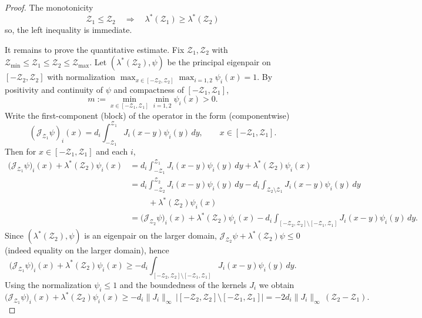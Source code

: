 \documentclass[a4paper,11pt]{amsart}
\theoremstyle{definition}
\numberwithin{equation}{section}
\theoremstyle{definition}
\begin{document}
\begin{proof}
The monotonicity
\[
\mathcal Z_1\leq\mathcal Z_2 \quad\Longrightarrow\quad \lambda^\ast(\mathcal Z_1)\geq\lambda^\ast(\mathcal Z_2)
\]
 so, the left inequality is immediate.

It remains to prove the quantitative estimate. Fix $\mathcal Z_1,\mathcal Z_2$ with
$\mathcal Z_{\min}\leq\mathcal Z_1\leq\mathcal Z_2\le\mathcal Z_{\max}$. Let
\((\lambda^\ast(\mathcal Z_2),\psi)\) be the principal eigenpair on $[-\mathcal Z_2,\mathcal Z_2]$ with normalization
\(\displaystyle\max_{x\in[-\mathcal Z_2,\mathcal Z_2]}\max_{i=1,2}\psi_i(x)=1\). By positivity and continuity of \(\psi\) and compactness of \([-{\mathcal Z_1},{\mathcal Z_1}]\),
\[
m:=\min_{x\in[-\mathcal Z_1,\mathcal Z_1]}\min_{i=1,2}\psi_i(x) >0 .
\]
Write the first-component (block) of the operator in the form (componentwise)
\[
(\mathscr J_{\mathcal Z_1}\psi)_i(x)
= d_i\int_{-\mathcal Z_1}^{\mathcal Z_1} J_i(x-y)\psi_i(y)\,dy,
\qquad x\in[-\mathcal Z_1,\mathcal Z_1].
\]
Then for \(x\in[-\mathcal Z_1,\mathcal Z_1]\) and each \(i\),
\[
\begin{aligned}
\big(\mathscr J_{\mathcal Z_1}\psi\big)_i(x) + \lambda^\ast(\mathcal Z_2)\psi_i(x)
&= d_i\int_{-\mathcal Z_1}^{\mathcal Z_1} J_i(x-y)\psi_i(y)\,dy + \lambda^\ast(\mathcal Z_2)\psi_i(x)\\
&= d_i\int_{-\mathcal Z_2}^{\mathcal Z_2} J_i(x-y)\psi_i(y)\,dy
     - d_i\int_{\mathcal Z_2\setminus\mathcal Z_1} J_i(x-y)\psi_i(y)\,dy \\
&\qquad\; + \lambda^\ast(\mathcal Z_2)\psi_i(x)\\
&= \big(\mathscr J_{\mathcal Z_2}\psi\big)_i(x) + \lambda^\ast(\mathcal Z_2)\psi_i(x)
     - d_i\int_{[-\mathcal Z_2,\mathcal Z_2]\setminus[-\mathcal Z_1,\mathcal Z_1]} J_i(x-y)\psi_i(y)\,dy.
\end{aligned}
\]
Since \((\lambda^\ast(\mathcal Z_2),\psi)\) is an eigenpair on the larger domain,
\(\mathscr J_{\mathcal Z_2}\psi + \lambda^\ast(\mathcal Z_2)\psi \leq 0\) (indeed equality on the larger domain),
hence
\[
\big(\mathscr J_{\mathcal Z_1}\psi\big)_i(x) + \lambda^\ast(\mathcal Z_2)\psi_i(x)
\geq - d_i\int_{[-\mathcal Z_2,\mathcal Z_2]\setminus[-\mathcal Z_1,\mathcal Z_1]} J_i(x-y)\psi_i(y)\,dy.
\]
Using the normalization \(\psi_i\leq 1\) and the boundedness of the kernels \(J_i\) we obtain
\[
\big(\mathscr J_{\mathcal Z_1}\psi\big)_i(x) + \lambda^\ast(\mathcal Z_2)\psi_i(x)
\geq - d_i\|J_i\|_\infty\, \big|[-\mathcal Z_2,\mathcal Z_2]\setminus[-\mathcal Z_1,\mathcal Z_1]\big|
= - 2d_i\|J_i\|_\infty \,(\mathcal Z_2-\mathcal Z_1).
\]


\end{proof}
\end{document}
